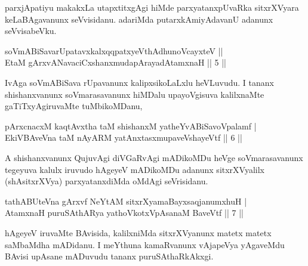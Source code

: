 \begin{artha}
parxjApatiyu makakxLa utapxtitxgAgi hiMde parxyatanxpUvaRka 
sitxrXVyara keLaBAgavanunx seVvisidanu. adariMda putarxkAmiyAdavanU 
adanunx seVvisabeVku.
\end{artha}


\begin{shl}
\footnotemark[1]soVmABiSavarUpatavxkalxqqpatxyeV\s thAdhunoVcayxteV || \\
EtaM gArxvANavaciCxshanxmudapArayadAtamxnaH \hfill|| 5 || 
\end{shl}

\begin{artha}
IvAga soVmABiSava rUpavanunx kalipxsikoLaLxlu heVLuvudu. I tananx 
shishanxvanunx soVmarasavanunx hiMDalu upayoVgisuva kalilxnaMte 
gaTiTxyAgiruvaMte tuMbikoMDanu,
\end{artha}


\begin{shl}
pArxcnacxM kaqtAvx\s tha taM shishanxM yatheYvABiSavoVpalamf | \\
EkiVBAveVna taM nAyARM yatAnxtasxmupaveVshayeVtf \hfill|| 6 || 
\end{shl}

\begin{artha}
A shishanxvanunx QujuvAgi diVGaRvAgi mADikoMDu heVge soVmarasavanunx 
tegeyuva kalulx iruvudo hAgeyeV mADikoMDu adanunx sitxrXVyalilx 
(shAsitxrXVya) parxyatanxdiMda oMdAgi seVrisidanu.
\end{artha}


\begin{shl}
tathABUteVna gArxvf NeYtAM sitxrXyamaBayxsaqjanumxhuH | \\
AtamxnaH puruSAthARya yathoVkotxVpAsanaM BaveVtf \hfill|| 7 || 
\end{shl}

\begin{artha}
hAgeyeV iruvaMte BAvisida, kalilxniMda sitxrXVyanunx matetx matetx 
saMbaMdha mADidanu. I meYthuna kamaRvanunx vAjapeVya yAgaveMdu BAvisi 
upAsane mADuvudu tananx puruSAthaRkAkxgi.
\end{artha}

